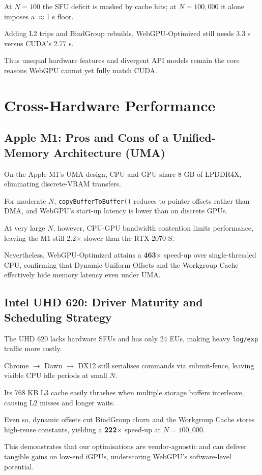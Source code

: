 \documentclass[12pt]{report}
\begin{document}
At $N=100$ the SFU deficit is masked by cache hits; at $N=100,000$ it alone imposes a $\approx$1 s floor.

Adding L2 trips and BindGroup rebuilds, WebGPU-Optimized still needs 3.3 s versus CUDA’s 2.77 s.

Thus unequal hardware features and divergent API models remain the core reasons WebGPU cannot yet fully match CUDA.

\section{Cross-Hardware Performance}
\subsection{Apple M1: Pros and Cons of a Unified-Memory Architecture (UMA)}
On the Apple M1’s UMA design, CPU and GPU share 8 GB of LPDDR4X, eliminating discrete-VRAM transfers.

For moderate $N$, \texttt{copyBufferToBuffer()} reduces to pointer offsets rather than DMA, and WebGPU’s start-up latency is lower than on discrete GPUs.

At very large $N$, however, CPU-GPU bandwidth contention limits performance, leaving the M1 still 2.2$\times$ slower than the RTX 2070 S.

Nevertheless, WebGPU-Optimized attains a \textbf{463$\times$} speed-up over single-threaded CPU, confirming that Dynamic Uniform Offsets and the Workgroup Cache effectively hide memory latency even under UMA.

\subsection{Intel UHD 620: Driver Maturity and Scheduling Strategy}
The UHD 620 lacks hardware SFUs and has only 24 EUs, making heavy \texttt{log/exp} traffic more costly.

Chrome $\rightarrow$ Dawn $\rightarrow$ DX12 still serialises commands via submit-fence, leaving visible CPU idle periods at small $N$.

Its 768 KB L3 cache easily thrashes when multiple storage buffers interleave, causing L2 misses and longer waits.

Even so, dynamic offsets cut BindGroup churn and the Workgroup Cache stores high-reuse constants, yielding a \textbf{222$\times$} speed-up at $N = 100,000$.

This demonstrates that our optimisations are vendor-agnostic and can deliver tangible gains on low-end iGPUs, underscoring WebGPU’s software-level potential.
\end{document}
